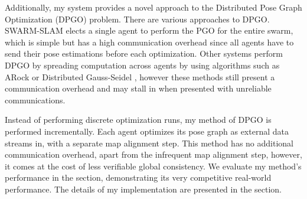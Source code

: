 Additionally, my system provides a novel approach to the Distributed Pose Graph Optimization (DPGO) problem. There are various approaches to DPGO. SWARM-SLAM \autocite{Lajoie_2024} elects a single agent to perform the PGO for the entire swarm, which is simple but has a high communication overhead since all agents have to send their pose estimations before each optimization. Other systems perform DPGO by spreading computation across agents by using algorithms such as ARock \autocite{Peng_2016} or Distributed Gauss-Seidel \autocite{DBLP:journals/corr/ChoudharyCNRCD17}, however these methods still present a communication overhead and may stall in when presented with unreliable communications.

Instead of performing discrete optimization runs, my method of DPGO is performed incrementally. Each agent optimizes its pose graph as external data streams in, with a separate map alignment step. This method has no additional communication overhead, apart from the infrequent map alignment step, however, it comes at the cost of less verifiable global consistency. We evaluate my method's performance in the  section, demonstrating its very competitive real-world performance. The details of my implementation are presented in the  section.






